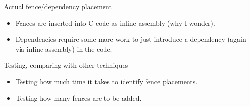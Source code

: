 \documentclass[notes, xcolor=dvipsnames]{beamer}
\begin{document}
    \begin{frame}{Actual fence/dependency placement}

        \begin{itemize}
            \item Fences are inserted into C code as inline assembly (why I wonder).
            \item Dependencies require some more work to just introduce a dependency (again via inline assembly) in the code.
        \end{itemize}

        \begin{figure}
        \end{figure}

        
    \end{frame}

    \begin{frame}{Testing, comparing with other techniques}
        
        \begin{itemize}
            \item Testing how much time it takes to identify fence placements.
            \item Testing how many fences are to be added. 
        \end{itemize}

        \begin{figure}
        \end{figure}

    \end{frame}
\end{document}
